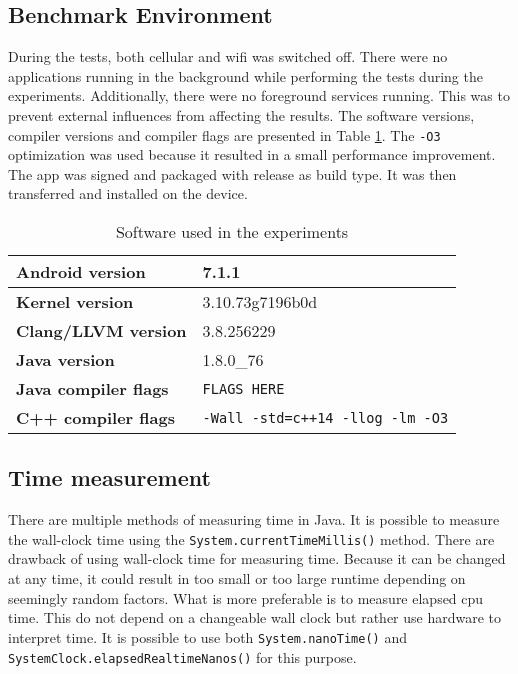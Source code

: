 
\subsection{Benchmark Environment}
During the tests, both cellular and wifi was switched off. There were no applications running in the background while performing the tests during the experiments. Additionally, there were no foreground services running. This was to prevent external influences from affecting the results. The software versions, compiler versions and compiler flags are presented in Table \ref{tab:software}. The \texttt{-O3} optimization was used because it resulted in a small performance improvement. The app was signed and packaged with release as build type. It was then transferred and installed on the device.

\begin{table}[H]
    \centering
    \caption{Software used in the experiments}
    \begin{tabular}{|l|l|}
        \hline
        \textbf{Android version} & 7.1.1\\
        \hline
        \textbf{Kernel version} & 3.10.73g7196b0d\\
        \hline
        \textbf{Clang/LLVM version} & 3.8.256229\\
        \hline
        \textbf{Java version} & 1.8.0\_76\\
        \hline
        \textbf{Java compiler flags} & \texttt{FLAGS HERE}\\
        \hline
        \textbf{C++ compiler flags} & \texttt{-Wall -std=c++14 -llog -lm -O3}\\
        \hline
    \end{tabular}
    \label{tab:software}
\end{table}


\subsection{Time measurement}
There are multiple methods of measuring time in Java. It is possible to measure the wall-clock time using the \texttt{System.currentTimeMillis()} method. There are drawback of using wall-clock time for measuring time. Because it can be changed at any time, it could result in too small or too large runtime depending on seemingly random factors. What is more preferable is to measure elapsed cpu time. This do not depend on a changeable wall clock but rather use hardware to interpret time. It is possible to use both \texttt{System.nanoTime()} and \texttt{SystemClock.elapsedRealtimeNanos()} for this purpose.

